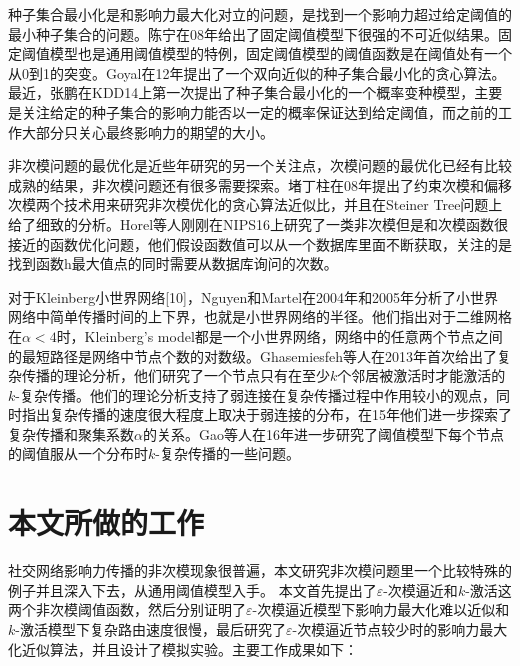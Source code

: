 种子集合最小化是和影响力最大化对立的问题，是找到一个影响力超过给定阈值的最小种子集合的问题。陈宁在08年\cite{Chen2008approximability}给出了固定阈值模型下很强的不可近似结果。固定阈值模型也是通用阈值模型的特例，固定阈值模型的阈值函数是在阈值处有一个从0到1的突变。Goyal在12年\cite{goyal2012minimizing}提出了一个双向近似的种子集合最小化的贪心算法。最近，张鹏\cite{zhang2014prob}在KDD14上第一次提出了种子集合最小化的一个概率变种模型，主要是关注给定的种子集合的影响力能否以一定的概率保证达到给定阈值，而之前的工作大部分只关心最终影响力的期望的大小。


非次模问题的最优化是近些年研究的另一个关注点，次模问题的最优化已经有比较成熟的结果，非次模问题还有很多需要探索。堵丁柱\cite{du2008analysis}在08年提出了约束次模和偏移次模两个技术用来研究非次模优化的贪心算法近似比，并且在Steiner Tree问题上给了细致的分析。Horel等人\cite{Horel2016sub}刚刚在NIPS16上研究了一类非次模但是和次模函数很接近的函数优化问题，他们假设函数值可以从一个数据库里面不断获取，关注的是找到函数h最大值点的同时需要从数据库询问的次数。

对于Kleinberg小世界网络[10]，Nguyen和Martel在2004年\cite{Martel2004analyzing}和2005年\cite{Nguyen2005analyzing}分析了小世界网络中简单传播时间的上下界，也就是小世界网络的半径。他们指出对于二维网格在$\alpha<4$时，Kleinberg’s model都是一个小世界网络，网络中的任意两个节点之间的最短路径是网络中节点个数的对数级。Ghasemiesfeh等人\cite{Ghasemiesfeh2013complex}在2013年首次给出了复杂传播的理论分析，他们研究了一个节点只有在至少$k$个邻居被激活时才能激活的$k$-复杂传播。他们的理论分析支持了弱连接在复杂传播过程中作用较小的观点，同时指出复杂传播的速度很大程度上取决于弱连接的分布，在15年\cite{ebrahimi2015complex}他们进一步探索了复杂传播和聚集系数$\alpha$的关系。Gao等人在16年\cite{gao2016gt}进一步研究了阈值模型下每个节点的阈值服从一个分布时$k$-复杂传播的一些问题。




\section{本文所做的工作}
社交网络影响力传播的非次模现象很普遍，本文研究非次模问题里一个比较特殊的例子并且深入下去，从通用阈值模型入手。
本文首先提出了$\varepsilon$-次模逼近和$k$-激活这两个非次模阈值函数，然后分别证明了$\varepsilon$-次模逼近模型下影响力最大化难以近似和$k$-激活模型下复杂路由速度很慢，最后研究了$\varepsilon$-次模逼近节点较少时的影响力最大化近似算法，并且设计了模拟实验。主要工作成果如下：


